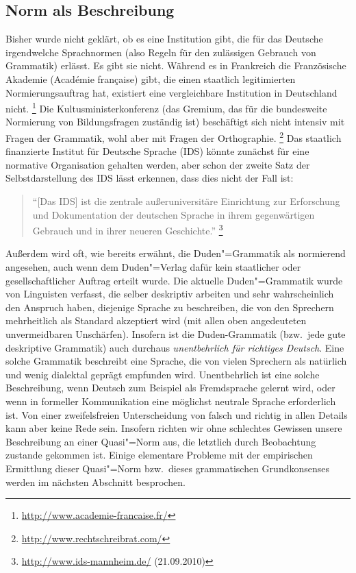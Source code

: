 \subsection{Norm als Beschreibung}

\label{sec:normalsbeschreibung}

Bisher wurde nicht geklärt, ob es eine Institution gibt, die für das Deutsche irgendwelche Sprachnormen (also Regeln für den zulässigen Gebrauch von Grammatik) erlässt.
Es gibt sie nicht.
Während es \zB in Frankreich die Französische Akademie (Académie française) gibt, die einen staatlich legitimierten Normierungsauftrag hat, existiert eine vergleichbare Institution in Deutschland nicht.%
\footnote{\raggedright{\url{http://www.academie-francaise.fr/}}}
Die Kultusministerkonferenz (das Gremium, das für die bundesweite Normierung von Bildungsfragen zuständig ist) beschäftigt sich nicht intensiv mit Fragen der Grammatik, wohl aber mit Fragen der Orthographie.%
\footnote{\url{http://www.rechtschreibrat.com/}}
Das staatlich finanzierte Institut für Deutsche Sprache (IDS) könnte zunächst für eine normative Organisation gehalten werden, aber schon der zweite Satz der Selbstdarstellung des IDS lässt erkennen, dass dies nicht der Fall ist:

\begin{quote}
  "`[Das IDS] ist die zentrale außeruniversitäre Einrichtung zur Erforschung und Dokumentation der deutschen Sprache in ihrem gegenwärtigen Gebrauch und in ihrer neueren Geschichte."'%
    \footnote{\raggedright{\url{http://www.ids-mannheim.de/} (21.09.2010)}}
\end{quote}

Außerdem wird oft, wie bereits erwähnt, die Duden"=Grammatik als normierend angesehen, auch wenn dem Duden"=Verlag dafür kein staatlicher oder gesellschaftlicher Auftrag erteilt wurde.
Die aktuelle Duden"=Grammatik wurde von Linguisten verfasst, die selber deskriptiv arbeiten und sehr wahrscheinlich den Anspruch haben, diejenige Sprache zu beschreiben, die von den Sprechern mehrheitlich als Standard akzeptiert wird (mit allen oben angedeuteten unvermeidbaren Unschärfen).
Insofern ist die Duden-Grammatik (bzw.\ jede gute deskriptive Grammatik) auch durchaus \textit{unentbehrlich für richtiges Deutsch}.
Eine solche Grammatik beschreibt eine Sprache, die von vielen Sprechern als natürlich und wenig dialektal geprägt empfunden wird.
Unentbehrlich ist eine solche Beschreibung, wenn Deutsch zum Beispiel als Fremdsprache gelernt wird, oder wenn in formeller Kommunikation eine möglichst neutrale Sprache erforderlich ist.
Von einer zweifelsfreien Unterscheidung von falsch und richtig in allen Details kann aber keine Rede sein.
Insofern richten wir ohne schlechtes Gewissen unsere Beschreibung an einer Quasi"=Norm aus, die letztlich durch Beobachtung zustande gekommen ist.
Einige elementare Probleme mit der empirischen Ermittlung dieser Quasi"=Norm bzw.\ dieses grammatischen Grundkonsenses werden im nächsten Abschnitt besprochen. 

